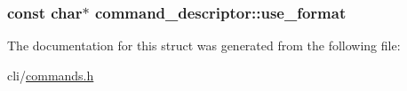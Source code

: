 \hypertarget{structcommand__descriptor_a3a8d81c564f70634beebed881d5a1902}{
\subsubsection[{use\+\_\+format}]{\setlength{\rightskip}{0pt plus 5cm}const char$\ast$ command\+\_\+descriptor\+::use\+\_\+format}}\label{structcommand__descriptor_a3a8d81c564f70634beebed881d5a1902}


The documentation for this struct was generated from the following file\+:\begin{DoxyCompactItemize}
\item 
cli/\hyperlink{commands_8h}{commands.\+h}\end{DoxyCompactItemize}

